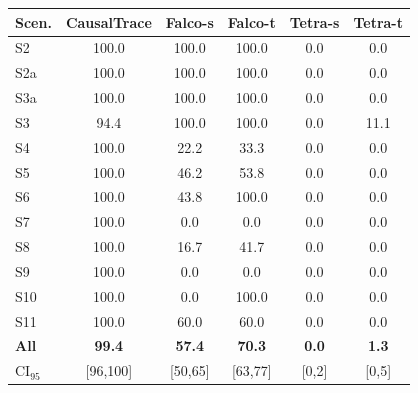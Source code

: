 \setlength\tabcolsep{3.2pt}
\begin{tabular}{@{}lccccc@{}}
\toprule
Scen. & CausalTrace & Falco-s & Falco-t & Tetra-s & Tetra-t \\
\midrule
S2 & 100.0 & 100.0 & 100.0 & 0.0 & 0.0 \\
S2a & 100.0 & 100.0 & 100.0 & 0.0 & 0.0 \\
S3a & 100.0 & 100.0 & 100.0 & 0.0 & 0.0 \\
S3 & 94.4 & 100.0 & 100.0 & 0.0 & 11.1 \\
S4 & 100.0 & 22.2 & 33.3 & 0.0 & 0.0 \\
S5 & 100.0 & 46.2 & 53.8 & 0.0 & 0.0 \\
S6 & 100.0 & 43.8 & 100.0 & 0.0 & 0.0 \\
S7 & 100.0 & 0.0 & 0.0 & 0.0 & 0.0 \\
S8 & 100.0 & 16.7 & 41.7 & 0.0 & 0.0 \\
S9 & 100.0 & 0.0 & 0.0 & 0.0 & 0.0 \\
S10 & 100.0 & 0.0 & 100.0 & 0.0 & 0.0 \\
S11 & 100.0 & 60.0 & 60.0 & 0.0 & 0.0 \\
\midrule
\textbf{All} & \textbf{99.4} & \textbf{57.4} & \textbf{70.3} & \textbf{0.0} & \textbf{1.3} \\
CI$_{95}$ & [96,100] & [50,65] & [63,77] & [0,2] & [0,5] \\
\bottomrule
\end{tabular}
